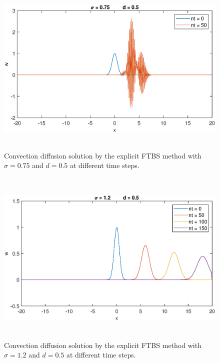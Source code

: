\documentclass[letterpaper,12pt]{article}
\begin{document}
\newpage
\begin{figure}[!ht] 
	\centering 
	\includegraphics[max height=8.5cm]{graphs/FTBS/ConvectionDiffusion/sigma075d05.eps}
	\caption{Convection diffusion solution by the explicit FTBS method with $\sigma= 0.75$ and $d=0.5$ at different time steps.}
	 \label{fig:FTBSsigma075d05}
\end{figure}
\begin{figure}[!ht] 
	\centering 
	\includegraphics[max height=8.5cm]{graphs/FTBS/ConvectionDiffusion/sigma12d05.eps}
	\caption{Convection diffusion solution by the explicit FTBS method with $\sigma= 1.2$ and $d=0.5$ at different time steps.}
	 \label{fig:FTBSsigma12d05}
\end{figure}
\newpage
\end{document}
